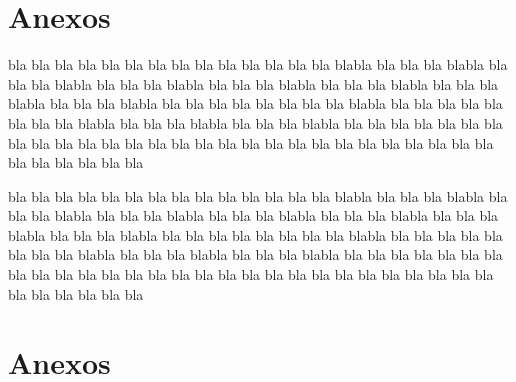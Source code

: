 \documentclass[11pt]{report}
\begin{document}

\appendix  
\clearpage %
\addappheadtotoc 
\appendixpage 

\section{Anexos}


bla bla bla bla bla bla bla bla bla bla bla bla bla bla blabla bla bla bla blabla bla bla bla blabla bla bla bla blabla bla bla bla blabla bla bla bla blabla bla bla bla blabla bla bla bla blabla bla bla bla bla bla bla bla bla blabla bla bla bla bla bla bla bla bla blabla bla bla bla blabla bla bla bla blabla bla bla bla bla bla bla bla bla bla bla bla bla bla bla bla bla bla bla bla bla bla bla bla bla bla bla bla bla bla bla bla bla bla bla 

bla bla bla bla bla bla bla bla bla bla bla bla bla bla blabla bla bla bla blabla bla bla bla blabla bla bla bla blabla bla bla bla blabla bla bla bla blabla bla bla bla blabla bla bla bla blabla bla bla bla bla bla bla bla bla blabla bla bla bla bla bla bla bla bla blabla bla bla bla blabla bla bla bla blabla bla bla bla bla bla bla bla bla bla bla bla bla bla bla bla bla bla bla bla bla bla bla bla bla bla bla bla bla bla bla bla bla bla bla 

\section{Anexos}
\end{document}
